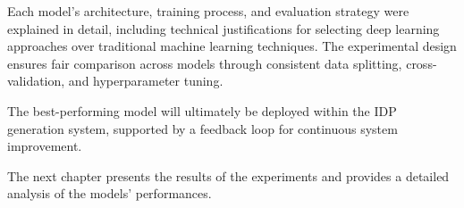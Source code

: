 Each model's architecture, training process, and evaluation strategy were explained in detail, including technical justifications for selecting deep learning approaches over traditional machine learning techniques. The experimental design ensures fair comparison across models through consistent data splitting, cross-validation, and hyperparameter tuning.

The best-performing model will ultimately be deployed within the IDP generation system, supported by a feedback loop for continuous system improvement. 

The next chapter presents the results of the experiments and provides a detailed analysis of the models' performances.